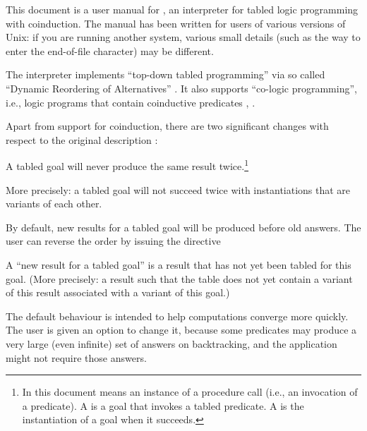 

This document is a user manual for , an interpreter for tabled
logic programming with coinduction.  The manual has been written for users of
various versions of Unix: if you are running another system, various small
details (such as the way to enter the end-of-file character) may be
different.

The interpreter implements ``top-down tabled programming'' via so called
``Dynamic Reordering of Alternatives'' \cite{guo-gupta-dra}.  It also
supports ``co-logic programming'', i.e., logic programs that contain
coinductive predicates \cite{coinductive}, \cite{co-LP}.


Apart from support for coinduction, there are two significant changes with
respect to the original description \cite{guo-gupta-dra}:
\begin{Enumerate}

\item
  A tabled goal will never produce the same result twice.\footnote{
  In this document  means an instance of a procedure call
  (i.e., an invocation of a predicate).  A  is a goal that invokes a tabled predicate. A
   is the instantiation of a goal when it succeeds.}

  More precisely: a tabled goal will not succeed twice with instantiations
  that are variants of each other.

\item
  By default, new results for a tabled goal will be produced before old
  answers.
  The user can reverse the order by issuing the directive\\
  \ind{}\label{dir:old-first}

  A ``new result for a tabled goal''\label{new-result} is a result that has not yet been tabled for
  this goal.  (More precisely: a result such that the table does not yet
  contain a variant of this result associated with a variant of this goal.)

  The default behaviour is intended to help computations converge more
  quickly.  The user is given an option to change it, because some predicates
  may produce a very large (even infinite) set of answers on backtracking,
  and the application might not require those answers.
\end{Enumerate}


